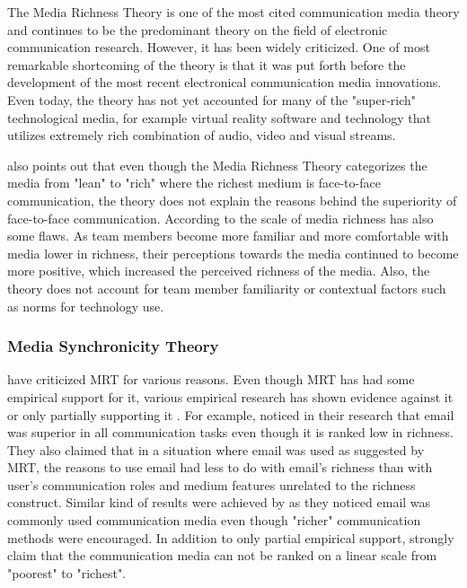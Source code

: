 \documentclass[english,12pt,a4paper,pdftex]{article}
\begin{document}
The Media Richness Theory is one of the most cited communication media theory and continues to be the predominant theory on the field of electronic communication research. However, it has been widely criticized. One of most remarkable shortcoming of the theory is that it was put forth before the development of the most recent electronical communication media innovations. Even today, the theory has not yet accounted for many of the "super-rich" technological media, for example virtual reality software and technology that utilizes extremely rich combination of audio, video and visual streams. \citep{derosa2004}

\citet{derosa2004} also points out that even though the Media Richness Theory categorizes the media from "lean" to "rich" where the richest medium is face-to-face communication, the theory does not explain the reasons behind the superiority of face-to-face communication. According to \citet{derosa2004} the scale of media richness has also some flaws. As team members become more familiar and more comfortable with media lower in richness, their perceptions towards the media continued to become more positive, which increased the perceived richness of the media. Also, the theory does not account for team member familiarity or contextual factors such as norms for technology use.

\subsubsection{Media Synchronicity Theory}

\citet{dennis1999} have criticized MRT for various reasons. Even though MRT has had some empirical support for it, various empirical research has shown evidence against it or only partially supporting it \citep{dennis1998} \citep{elshinnawy1997}. For example, \citet{elshinnawy1997} noticed in their research that email was superior in all communication tasks even though it is ranked low in richness. They also claimed that in a situation where email was used as suggested by MRT, the reasons to use email had less to do with email's richness than with user's communication roles and medium features unrelated to the richness construct. Similar kind of results were achieved by \citet{korkala2006} as they noticed email was commonly used communication media even though "richer" communication methods were encouraged. In addition to only partial empirical support, \citet{dennis1999} strongly claim that the communication media can not be ranked on a linear scale from "poorest" to "richest".
\end{document}
